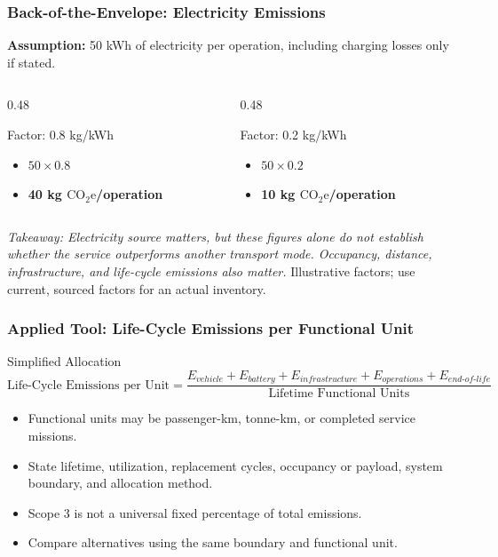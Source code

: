 \documentclass{beamer}
\begin{document}
\begin{frame}[t,shrink=10]
\frametitle{Back-of-the-Envelope: Electricity Emissions}
\textbf{Assumption:} 50 kWh of electricity per operation, including charging losses only if stated.
\begin{columns}[T]
\begin{column}{0.48\textwidth}\begin{block}{Factor: 0.8 kg/kWh}
\begin{itemize}
\item $50\times0.8$
\item \textbf{40 kg $\mathrm{CO_2e}$/operation}
\end{itemize}\end{block}\end{column}
\begin{column}{0.48\textwidth}\begin{block}{Factor: 0.2 kg/kWh}
\begin{itemize}
\item $50\times0.2$
\item \textbf{10 kg $\mathrm{CO_2e}$/operation}
\end{itemize}\end{block}\end{column}
\end{columns}
\textit{Takeaway: Electricity source matters, but these figures alone do not establish whether the service outperforms another transport mode. Occupancy, distance, infrastructure, and life-cycle emissions also matter.}
\vfill{\tiny Illustrative factors; use current, sourced factors for an actual inventory.}
\end{frame}

\begin{frame}[t]
\frametitle{Applied Tool: Life-Cycle Emissions per Functional Unit}
\begin{block}{Simplified Allocation}
\[
\text{Life-Cycle Emissions per Unit}
=
\frac{E_{vehicle}+E_{battery}+E_{infrastructure}+E_{operations}+E_{end\text{-}of\text{-}life}}
{\text{Lifetime Functional Units}}
\]
\end{block}
\begin{itemize}
\item Functional units may be passenger-km, tonne-km, or completed service missions.
\item State lifetime, utilization, replacement cycles, occupancy or payload, system boundary, and allocation method.
\item Scope 3 is not a universal fixed percentage of total emissions.
\item Compare alternatives using the same boundary and functional unit.
\end{itemize}
\end{frame}
\end{document}
